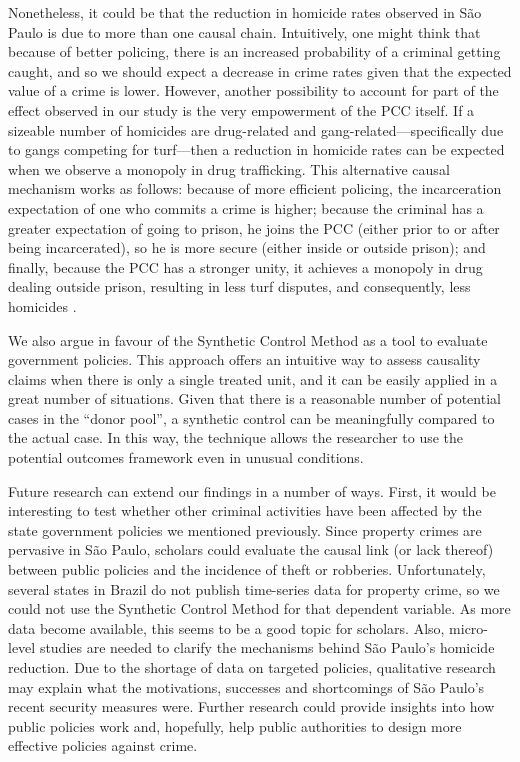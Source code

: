 \documentclass[a4paper,11pt]{article}
\begin{document}
Nonetheless, it could be that the reduction in homicide rates observed in S\~{a}o Paulo is due to more than one causal chain. Intuitively, one might think that because of better policing, there is an increased probability of a criminal getting caught, and so we should expect a decrease in crime rates given that the expected value of a crime is lower. However, another possibility to account for part of the effect observed in our study is the very empowerment of the PCC itself. If a sizeable number of homicides are drug-related and gang-related---specifically due to gangs competing for turf---then a reduction in homicide rates can be expected when we observe a monopoly in drug trafficking. This alternative causal mechanism works as follows: because of more efficient policing, the incarceration expectation of one who commits a crime is higher; because the criminal has a greater expectation of going to prison, he joins the PCC (either prior to or after being incarcerated), so he is more secure (either inside or outside prison); and finally, because the PCC has a stronger unity, it achieves a monopoly in drug dealing outside prison, resulting in less turf disputes, and consequently, less homicides \citep{skarbek2011}.

We also argue in favour of the Synthetic Control Method as a tool to evaluate government policies. This approach offers an intuitive way to assess causality claims when there is only a single treated unit, and it can be easily applied in a great number of situations. Given that there is a reasonable number of potential cases in the ``donor pool'', a synthetic control can be meaningfully compared to the actual case. In this way, the technique allows the researcher to use the potential outcomes framework even in unusual conditions. 

Future research can extend our findings in a number of ways. First, it would be interesting to test whether other criminal activities have been affected by the state government policies we mentioned previously. Since property crimes are pervasive in S\~{a}o Paulo, scholars could evaluate the causal link (or lack thereof) between public policies and the incidence of theft or robberies. Unfortunately, several states in Brazil do not publish time-series data for property crime, so we could not use the Synthetic Control Method for that dependent variable. As more data become available, this seems to be a good topic for scholars. Also, micro-level studies are needed to clarify the mechanisms behind S\~{a}o Paulo's homicide reduction. Due to the shortage of data on targeted policies, qualitative research may explain what the motivations, successes and shortcomings of S\~{a}o Paulo's recent security measures were. Further research could provide insights into how public policies work and, hopefully, help public authorities to design more effective policies against crime.

\newpage


\end{document}
